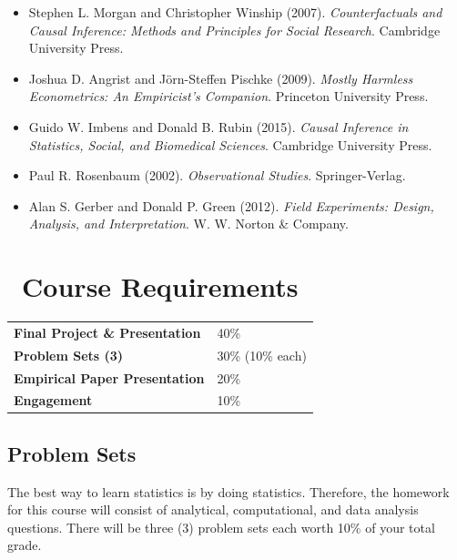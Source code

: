 \documentclass[11pt,letterpaper]{article}
\begin{document}
\begin{itemize}[leftmargin=*]
  \item Stephen L. Morgan and Christopher Winship (2007). \textit{Counterfactuals and Causal Inference: Methods and Principles for Social Research}. Cambridge University Press.
  \item Joshua D. Angrist and J\"{o}rn-Steffen Pischke (2009). \textit{Mostly Harmless Econometrics: An Empiricist's Companion}. Princeton University Press.
  \item Guido W. Imbens and Donald B. Rubin (2015). \textit{Causal Inference in Statistics, Social, and Biomedical Sciences}. Cambridge University Press.
  \item Paul R. Rosenbaum (2002). \textit{Observational Studies}. Springer-Verlag.
  \item Alan S. Gerber and Donald P. Green (2012). \textit{Field Experiments: Design, Analysis, and Interpretation}. W. W. Norton \& Company.
\end{itemize}

\section*{\ Course Requirements}

\begin{tabular}{@{}ll}
\textbf{Final Project \& Presentation} & 40\% \\
\textbf{Problem Sets (3)} & 30\% (10\% each) \\
\textbf{Empirical Paper Presentation} & 20\% \\
\textbf{Engagement} & 10\% \\
\end{tabular}

\subsection*{Problem Sets}

The best way to learn statistics is by doing statistics. Therefore, the homework for this course will consist of analytical, computational, and data analysis questions. There will be three (3) problem sets each worth 10\% of your total grade.
\end{document}

